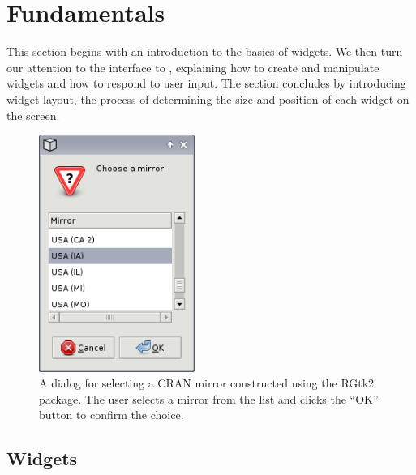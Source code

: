 \documentclass[article]{jss}
\begin{document}
\section{Fundamentals}

This section begins with an introduction to the basics of  widgets.
We then turn our attention to the  interface to 
, explaining how to create and manipulate widgets and how to respond to
user input. The section concludes by introducing widget layout, the process
of determining the size and position of each widget on the screen.


\begin{figure}
\begin{center}
\includegraphics[width=2in]{cran-mirror.png}
\caption{\label{fig:cran-mirror}A dialog for selecting a CRAN mirror constructed
using the RGtk2 package. The user selects a mirror from the list and clicks the
``OK'' button to confirm the choice.}
\end{center}
\end{figure}

\subsection[GTK+ Widgets]{ Widgets}
\end{document}
